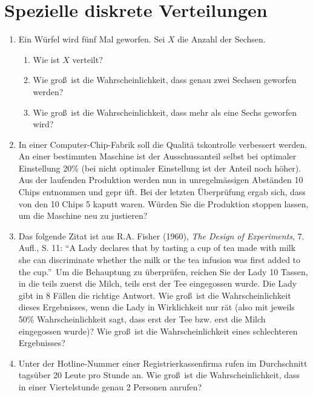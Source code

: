 \section[Diskrete Verteilungen]{Spezielle diskrete Verteilungen}

\begin{enumerate}
\item Ein W\"{u}rfel wird f\"{u}nf Mal geworfen. Sei $X$ die
Anzahl der Sechsen.
\begin{enumerate}
\item Wie ist $X$ verteilt?
\item Wie gro\ss\ ist die Wahrscheinlichkeit, dass genau zwei Sechsen
geworfen werden?
\item Wie gro\ss\ ist die Wahrscheinlichkeit, dass mehr als eine Sechs
geworfen wird?
\end{enumerate}

\item In einer Computer-Chip-Fabrik soll die Qualit\"{a}%
tskontrolle verbessert werden. An einer bestimmten Maschine ist der
Ausschussanteil selbst bei optimaler Einstellung 20\% (bei nicht optimaler
Einstellung ist der Anteil noch h\"{o}her). Aus der laufenden Produktion
werden nun in unregelm\"{a}ssigen Abst\"{a}nden 10 Chips entnommen und gepr%
\"{u}ft. Bei der letzten \"{U}berpr\"{u}fung ergab sich, dass von den 10
Chips 5 kaputt waren. W\"{u}rden Sie die Produktion stoppen lassen, um die
Maschine neu zu justieren?

\item Das folgende Zitat ist aus R.A. Fisher (1960), \emph{The
Design of Experiments}, 7. Aufl., S. 11: \textquotedblleft A Lady declares
that by tasting a cup of tea made with milk she can discriminate whether the
milk or the tea infusion was first added to the cup.\textquotedblright\ Um
die Behauptung zu \"{u}berpr\"{u}fen, reichen Sie der Lady 10 Tassen, in die
teils zuerst die Milch, teils erst der Tee eingegossen wurde. Die Lady gibt
in 8 F\"{a}llen die richtige Antwort. Wie gro\ss\ ist die Wahrscheinlichkeit
dieses Ergebnisses, wenn die Lady in Wirklichkeit nur r\"{a}t (also mit
jeweils 50\% Wahrscheinlichkeit sagt, dass erst der Tee bzw. erst die Milch
eingegossen wurde)? Wie gro\ss\ ist die Wahrscheinlichkeit eines
schlechteren Ergebnisses?

\item Unter der Hotline-Nummer einer Registrierkassenfirma
rufen im Durchschnitt tags\"{u}ber 20 Leute pro Stunde an. Wie gro\ss\ ist
die Wahrscheinlichkeit, dass in einer Viertelstunde genau 2 Personen anrufen?


\end{enumerate}
